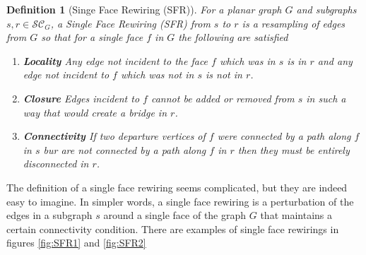 \documentclass{article}
\newtheorem{definition}{Definition}[section]
\begin{document}
\begin{definition}[Singe Face Rewiring (SFR)]
    For a planar graph $G$ and subgraphs $s,r\in \mathcal{SC}_G$, a Single Face Rewiring (SFR) from $s$ to $r$ is a resampling of edges from $G$ so that for a single face $f$ in $G$ the following are satisfied
    \begin{enumerate}
        \item \textbf{Locality} Any edge not incident to the face $f$ which was in $s$ is in $r$ and any edge not incident to $f$ which was not in $s$ is not in $r$.
        \item \textbf{Closure} Edges incident to $f$ cannot be added or removed from $s$ in such a way that would create a bridge in $r$. 
        \item \textbf{Connectivity} If two departure vertices of $f$ were connected by a path along $f$ in $s$ bur are not connected by a path along $f$ in $r$ then they must be entirely disconnected in $r$.
    \end{enumerate}
\end{definition}

The definition of a single face rewiring seems complicated, but they are indeed easy to imagine. In simpler words, a single face rewiring is a perturbation of the edges in a subgraph $s$ around a single face of the graph $G$ that maintains a certain connectivity condition. There are examples of single face rewirings in figures \ref{fig:SFR1} and \ref{fig:SFR2}
\end{document}
